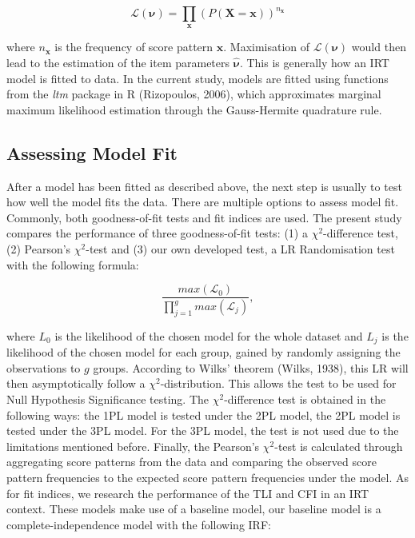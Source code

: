 \documentclass[Royal,sageapa,times,doublespace]{sagej}
\begin{document}
\begin{equation}
\mathcal{L}(\boldsymbol{\nu}) = \prod_{\boldsymbol{x}} (P(\boldsymbol{X} = \boldsymbol{x}))^{n_{\boldsymbol{x}}}
\end{equation}

where $n_{\boldsymbol{x}}$ is the frequency of score pattern $\boldsymbol{x}$. Maximisation of $\mathcal{L}(\boldsymbol{\nu})$ would then lead to the estimation of the item parameters $\boldsymbol{\hat{\nu}}$. This is generally how an IRT model is fitted to data. In the current study, models are fitted using functions from the \textit{ltm} package in R (Rizopoulos, 2006), which approximates marginal maximum likelihood estimation through the Gauss-Hermite quadrature rule.
\subsection{Assessing Model Fit}
\indent After a model has been fitted as described above, the next step is usually to test how well the model fits the data. There are multiple options to assess model fit. Commonly, both goodness-of-fit tests and fit indices are used. The present study compares the performance of three goodness-of-fit tests: (1) a $\chi^2$-difference test, (2) Pearson's $\chi^2$-test and (3) our own developed test, a LR Randomisation test with the following formula:

\begin{equation}
\frac{max(\mathcal{L}_0)}{\prod_{j = 1}^g max(\mathcal{L}_j)},
\end{equation}

where $L_0$ is the likelihood of the chosen model for the whole dataset and $L_j$ is the likelihood of the chosen model for each group, gained by randomly assigning the observations to $g$ groups. According to Wilks' theorem (Wilks, 1938), this LR will then asymptotically follow a $\chi^2$-distribution. This allows the test to be used for Null Hypothesis Significance testing. The $\chi^2$-difference test is obtained in the following ways: the 1PL model is tested under the 2PL model, the 2PL model is tested under the 3PL model. For the 3PL model, the test is not used due to the limitations mentioned before. Finally, the Pearson's $\chi^2$-test is calculated through aggregating score patterns from the data and comparing the observed score pattern frequencies to the expected score pattern frequencies under the model. As for fit indices, we research the performance of the TLI and CFI in an IRT context. These models make use of a baseline model, our baseline model is a complete-independence model with the following IRF:
\end{document}
